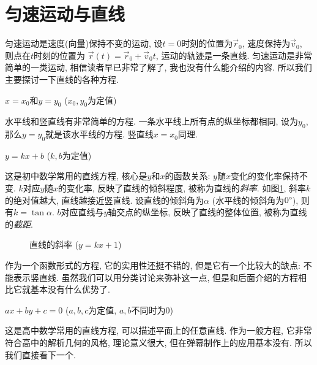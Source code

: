 \section{匀速运动与直线} \label{sec:curve-line}

匀速运动是速度(向量)保持不变的运动,
设$t=0$时刻的位置为$\vec r_0$,
速度保持为$\vec v_0$, 则点在$t$时刻的位置为
$\vec r(t) = \vec r_0 + \vec v_0 t$,
运动的轨迹是一条直线.
匀速运动是非常简单的一类运动, 相信读者早已非常了解了,
我也没有什么能介绍的内容. 所以我们主要探讨一下直线的各种方程.

\hlinefill

\noindent $x=x_0$和$y=y_0$ ($x_0,y_0$为定值)

水平线和竖直线有非常简单的方程. 一条水平线上所有点的纵坐标都相同,
设为$y_0$, 那么$y=y_0$就是该水平线的方程. 竖直线$x=x_0$同理.

\hlinefill

\noindent $y=kx+b$ ($k,b$为定值)

这是初中数学常用的直线方程, 核心是$y$和$x$的函数关系:
$y$随$x$变化的变化率保持不变.
$k$对应$y$随$x$的变化率, 反映了直线的倾斜程度, 被称为直线的\emph{斜率}.
如图\ref{fig:line-k}, 斜率$k$的绝对值越大, 直线越接近竖直线.
设直线的倾斜角为$\alpha$ (水平线的倾斜角为$0\degree$),
则有$k = \tan\alpha$.
$b$对应直线与$y$轴交点的纵坐标, 反映了直线的整体位置,
被称为直线的\emph{截距}.

\begin{figure}[htbp]
  \centering
  \caption{直线的斜率 ($y=kx+1$)}
  \label{fig:line-k}
\end{figure}

作为一个函数形式的方程, 它的实用性还挺不错的,
但是它有一个比较大的缺点: 不能表示竖直线.
虽然我们可以用分类讨论来弥补这一点,
但是和后面介绍的方程相比它就基本没有什么优势了.

\hlinefill

\noindent $ax+by+c=0$ ($a,b,c$为定值, $a,b$不同时为0)

这是高中数学常用的直线方程, 可以描述平面上的任意直线.
作为一般方程, 它非常符合高中的解析几何的风格, 理论意义很大,
但在弹幕制作上的应用基本没有. 所以我们直接看下一个.

